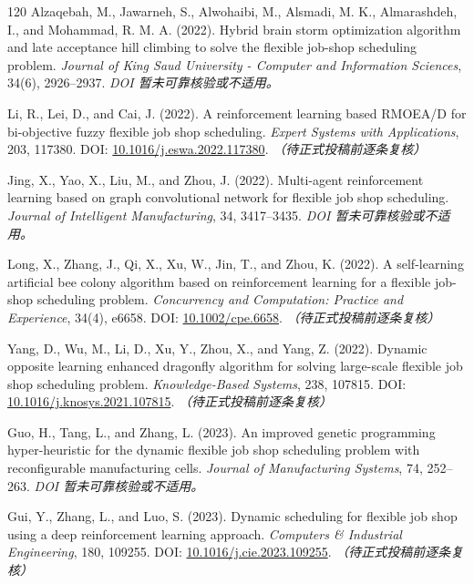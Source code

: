 \documentclass[UTF8,a4paper,11pt]{ctexart}
\begin{document}
\begin{thebibliography}{120}
Alzaqebah, M., Jawarneh, S., Alwohaibi, M., Alsmadi, M. K., Almarashdeh, I., and Mohammad, R. M. A. (2022). Hybrid brain storm optimization algorithm and late acceptance hill climbing to solve the flexible job-shop scheduling problem. \emph{Journal of King Saud University - Computer and Information Sciences}, 34(6), 2926--2937.
\newblock \textit{DOI 暂未可靠核验或不适用。}

Li, R., Lei, D., and Cai, J. (2022). A reinforcement learning based RMOEA/D for bi-objective fuzzy flexible job shop scheduling. \emph{Expert Systems with Applications}, 203, 117380.
\newblock DOI: \href{https://doi.org/10.1016/j.eswa.2022.117380}{10.1016/j.eswa.2022.117380}. \textit{（待正式投稿前逐条复核）}

Jing, X., Yao, X., Liu, M., and Zhou, J. (2022). Multi-agent reinforcement learning based on graph convolutional network for flexible job shop scheduling. \emph{Journal of Intelligent Manufacturing}, 34, 3417--3435.
\newblock \textit{DOI 暂未可靠核验或不适用。}

Long, X., Zhang, J., Qi, X., Xu, W., Jin, T., and Zhou, K. (2022). A self-learning artificial bee colony algorithm based on reinforcement learning for a flexible job-shop scheduling problem. \emph{Concurrency and Computation: Practice and Experience}, 34(4), e6658.
\newblock DOI: \href{https://doi.org/10.1002/cpe.6658}{10.1002/cpe.6658}. \textit{（待正式投稿前逐条复核）}

Yang, D., Wu, M., Li, D., Xu, Y., Zhou, X., and Yang, Z. (2022). Dynamic opposite learning enhanced dragonfly algorithm for solving large-scale flexible job shop scheduling problem. \emph{Knowledge-Based Systems}, 238, 107815.
\newblock DOI: \href{https://doi.org/10.1016/j.knosys.2021.107815}{10.1016/j.knosys.2021.107815}. \textit{（待正式投稿前逐条复核）}

Guo, H., Tang, L., and Zhang, L. (2023). An improved genetic programming hyper-heuristic for the dynamic flexible job shop scheduling problem with reconfigurable manufacturing cells. \emph{Journal of Manufacturing Systems}, 74, 252--263.
\newblock \textit{DOI 暂未可靠核验或不适用。}

Gui, Y., Zhang, L., and Luo, S. (2023). Dynamic scheduling for flexible job shop using a deep reinforcement learning approach. \emph{Computers \& Industrial Engineering}, 180, 109255.
\newblock DOI: \href{https://doi.org/10.1016/j.cie.2023.109255}{10.1016/j.cie.2023.109255}. \textit{（待正式投稿前逐条复核）}


\end{thebibliography}
\end{document}
